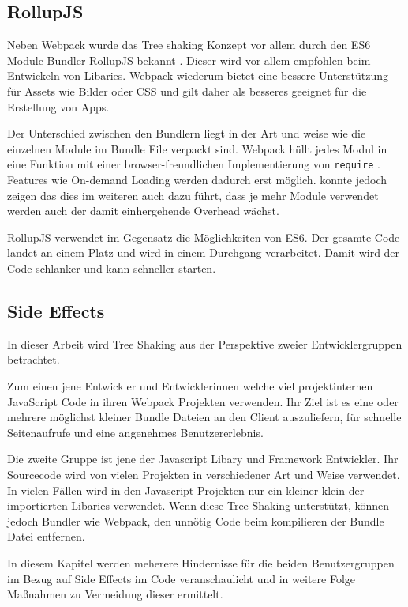 \subsection{RollupJS}
Neben Webpack wurde das Tree shaking Konzept vor allem durch den ES6 Module Bundler RollupJS bekannt \autocite{WebpackTreeShaking}. Dieser wird vor allem empfohlen beim Entwickeln von Libaries. Webpack wiederum bietet eine bessere Unterstützung für Assets wie Bilder oder CSS und gilt daher als besseres geeignet für die Erstellung von Apps. \autocite{RichHarris}

Der Unterschied zwischen den Bundlern liegt in der Art und weise wie die einzelnen Module im Bundle File verpackt sind. Webpack hüllt jedes Modul in eine Funktion mit einer browser-freundlichen Implementierung von \lstinline{require} \autocite{RichHarris}. Features wie On-demand Loading werden dadurch erst möglich. \textcite{NolanLawson} konnte jedoch zeigen das dies im weiteren auch dazu führt, dass je mehr Module verwendet werden auch der damit einhergehende Overhead wächst.

RollupJS verwendet im Gegensatz die Möglichkeiten von ES6. Der gesamte Code landet an einem Platz und wird in einem Durchgang verarbeitet. Damit wird der Code schlanker und kann schneller starten. \autocite{RichHarris}

\subsection{Side Effects}
\label{subsection:side_effects}
In dieser Arbeit wird Tree Shaking aus der Perspektive zweier Entwicklergruppen betrachtet. 

Zum einen jene Entwickler und Entwicklerinnen welche viel projektinternen JavaScript Code in ihren Webpack Projekten verwenden. Ihr Ziel ist es eine oder mehrere möglichst kleiner Bundle Dateien an den Client auszuliefern, für schnelle Seitenaufrufe und eine angenehmes Benutzererlebnis.

Die zweite Gruppe ist jene der Javascript Libary und Framework Entwickler. Ihr Sourcecode wird von vielen Projekten in verschiedener Art und Weise verwendet. In vielen Fällen wird in den Javascript Projekten nur ein kleiner klein der importierten Libaries verwendet. Wenn diese Tree Shaking unterstützt, können jedoch Bundler wie Webpack, den unnötig Code beim kompilieren der Bundle Datei entfernen.

In diesem Kapitel werden meherere Hindernisse für die beiden Benutzergruppen im Bezug auf Side Effects im Code veranschaulicht und in weitere Folge Maßnahmen zu Vermeidung dieser ermittelt. 


